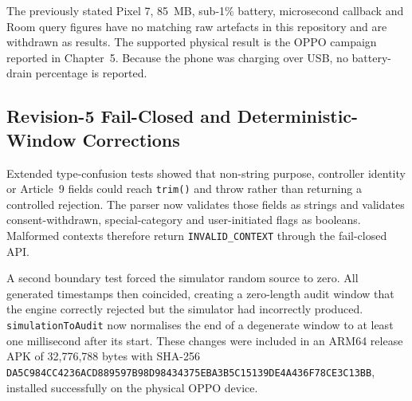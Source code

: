 The previously stated Pixel 7, 85~MB, sub-1\% battery, microsecond callback and Room query figures have no matching raw artefacts in this repository and are withdrawn as results. The supported physical result is the OPPO campaign reported in Chapter~5. Because the phone was charging over USB, no battery-drain percentage is reported.
\subsection{Revision-5 Fail-Closed and Deterministic-Window Corrections}

Extended type-confusion tests showed that non-string purpose, controller identity or Article~9 fields could reach \texttt{trim()} and throw rather than returning a controlled rejection. The parser now validates those fields as strings and validates consent-withdrawn, special-category and user-initiated flags as booleans. Malformed contexts therefore return \texttt{INVALID\_CONTEXT} through the fail-closed API.

A second boundary test forced the simulator random source to zero. All generated timestamps then coincided, creating a zero-length audit window that the engine correctly rejected but the simulator had incorrectly produced. \texttt{simulationToAudit} now normalises the end of a degenerate window to at least one millisecond after its start. These changes were included in an ARM64 release APK of 32,776,788 bytes with SHA-256 \texttt{DA5C984CC4236ACD889597B98D98434375EBA3B5C15139DE4A436F78CE3C13BB}, installed successfully on the physical OPPO device.
